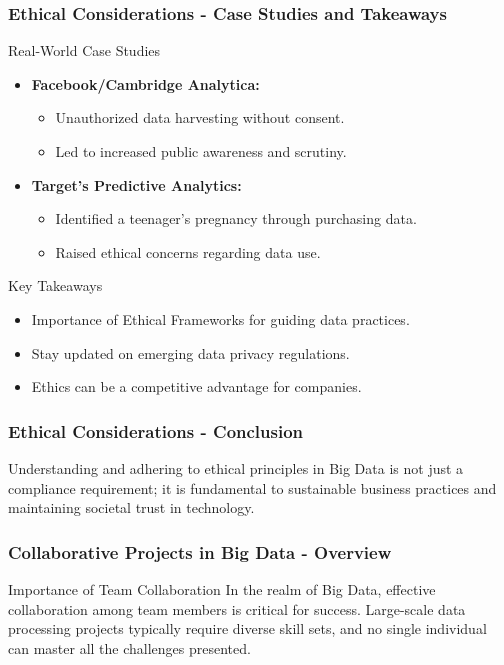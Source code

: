 \documentclass[aspectratio=169]{beamer}
\begin{document}
\begin{frame}[fragile]
    \frametitle{Ethical Considerations - Case Studies and Takeaways}
    \begin{block}{Real-World Case Studies}
        \begin{itemize}
            \item \textbf{Facebook/Cambridge Analytica:}
                \begin{itemize}
                    \item Unauthorized data harvesting without consent.
                    \item Led to increased public awareness and scrutiny.
                \end{itemize}
            \item \textbf{Target's Predictive Analytics:}
                \begin{itemize}
                    \item Identified a teenager's pregnancy through purchasing data.
                    \item Raised ethical concerns regarding data use.
                \end{itemize}
        \end{itemize}
    \end{block}
    \begin{block}{Key Takeaways}
        \begin{itemize}
            \item Importance of Ethical Frameworks for guiding data practices.
            \item Stay updated on emerging data privacy regulations.
            \item Ethics can be a competitive advantage for companies.
        \end{itemize}
    \end{block}
\end{frame}

\begin{frame}[fragile]
    \frametitle{Ethical Considerations - Conclusion}
    Understanding and adhering to ethical principles in Big Data is not just a compliance requirement; it is fundamental to sustainable business practices and maintaining societal trust in technology.
\end{frame}

\begin{frame}[fragile]
    \frametitle{Collaborative Projects in Big Data - Overview}
    \begin{block}{Importance of Team Collaboration}
        In the realm of Big Data, effective collaboration among team members is critical for success. 
        Large-scale data processing projects typically require diverse skill sets, and no single individual can master all the challenges presented.
    \end{block}
\end{frame}
\end{document}
